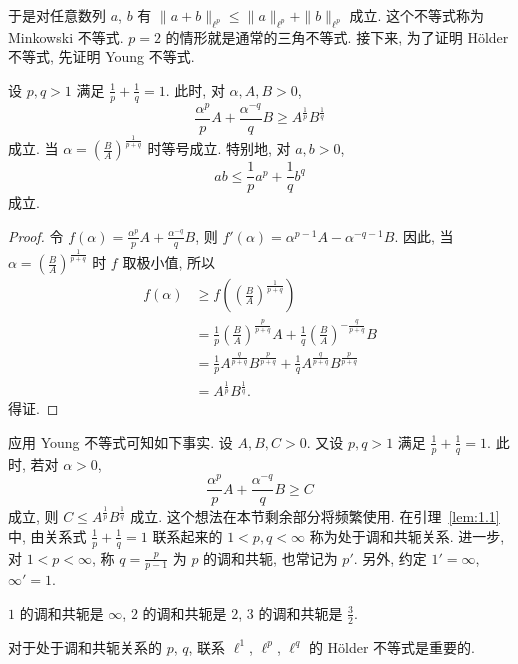 于是对任意数列 $a$, $b$ 有 $\|a + b\|_{\ell^{p}} \leq \|a\|_{\ell^{p}} + \|b\|_{\ell^{p}}$ 成立. 这个不等式称为 Minkowski 不等式. $p = 2$ 的情形就是通常的三角不等式. 接下来, 为了证明 Hölder 不等式, 先证明 Young 不等式.

\begin{lemma}\label{lem:1.1}
设 $p, q > 1$ 满足 $\frac{1}{p} + \frac{1}{q} = 1$. 此时, 对 $\alpha, A, B > 0$,
\[
\frac{\alpha^{p}}{p}A + \frac{\alpha^{-q}}{q}B \geq A^{\frac{1}{p}}B^{\frac{1}{q}}
\]
成立. 当 $\alpha = \left(\frac{B}{A}\right)^{\frac{1}{p+q}}$ 时等号成立. 特别地, 对 $a, b > 0$,
\[
ab \leq \frac{1}{p}a^{p} + \frac{1}{q}b^{q}
\]
成立.
\end{lemma}

\begin{proof}
令 $f(\alpha) = \frac{\alpha^{p}}{p}A + \frac{\alpha^{-q}}{q}B$, 则 $f'(\alpha) = \alpha^{p-1}A - \alpha^{-q-1}B$. 因此, 当 $\alpha = \left(\frac{B}{A}\right)^{\frac{1}{p+q}}$ 时 $f$ 取极小值, 所以
\begin{align*}
f(\alpha) & \geq f\left(\left(\frac{B}{A}\right)^{\frac{1}{p+q}}\right) \\
& = \frac{1}{p}\left(\frac{B}{A}\right)^{\frac{p}{p+q}}A + \frac{1}{q}\left(\frac{B}{A}\right)^{-\frac{q}{p+q}}B \\
& = \frac{1}{p}A^{\frac{q}{p+q}}B^{\frac{p}{p+q}} + \frac{1}{q}A^{\frac{q}{p+q}}B^{\frac{p}{p+q}} \\
& = A^{\frac{1}{p}}B^{\frac{1}{q}}.
\end{align*}
得证.
\end{proof}

应用 Young 不等式可知如下事实. 设 $A, B, C > 0$. 又设 $p, q > 1$ 满足 $\frac{1}{p} + \frac{1}{q} = 1$. 此时, 若对 $\alpha > 0$,
\[
\frac{\alpha^{p}}{p}A + \frac{\alpha^{-q}}{q}B \geq C
\]
成立, 则 $C \leq A^{\frac{1}{p}}B^{\frac{1}{q}}$ 成立. 这个想法在本节剩余部分将频繁使用. 在引理~\ref{lem:1.1} 中, 由关系式 $\frac{1}{p} + \frac{1}{q} = 1$ 联系起来的 $1 < p, q < \infty$ 称为处于调和共轭关系. 进一步, 对 $1 < p < \infty$, 称 $q = \frac{p}{p-1}$ 为 $p$ 的调和共轭, 也常记为 $p'$. 另外, 约定 $1' = \infty$, $\infty' = 1$.

\begin{example}\label{exa:1.2}
$1$ 的调和共轭是 $\infty$, $2$ 的调和共轭是 $2$, $3$ 的调和共轭是 $\frac{3}{2}$.
\end{example}

对于处于调和共轭关系的 $p$, $q$, 联系 $\ell^{1}$, $\ell^{p}$, $\ell^{q}$ 的 Hölder 不等式是重要的.

